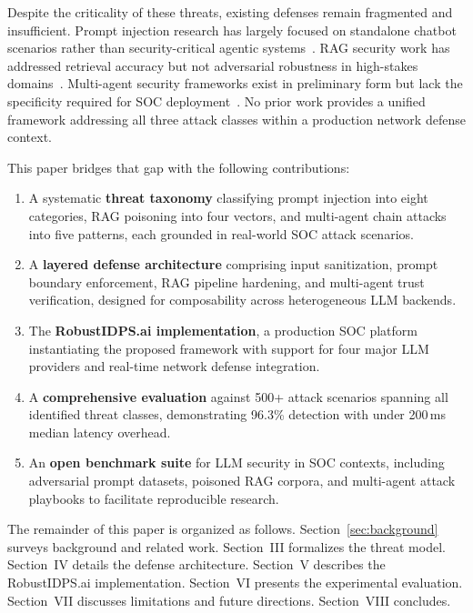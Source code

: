 \documentclass[journal,twoside]{IEEEtran}
\begin{document}
Despite the criticality of these threats, existing defenses remain fragmented and insufficient. Prompt injection research has largely focused on standalone chatbot scenarios rather than security-critical agentic systems~\cite{liu2024formalizing}. RAG security work has addressed retrieval accuracy but not adversarial robustness in high-stakes domains~\cite{gao2024rag}. Multi-agent security frameworks exist in preliminary form but lack the specificity required for SOC deployment~\cite{talebirad2023multiagent}. No prior work provides a unified framework addressing all three attack classes within a production network defense context.

This paper bridges that gap with the following contributions:

\begin{enumerate}
\item A systematic \textbf{threat taxonomy} classifying prompt injection into eight categories, RAG poisoning into four vectors, and multi-agent chain attacks into five patterns, each grounded in real-world SOC attack scenarios.

\item A \textbf{layered defense architecture} comprising input sanitization, prompt boundary enforcement, RAG pipeline hardening, and multi-agent trust verification, designed for composability across heterogeneous LLM backends.

\item The \textbf{RobustIDPS.ai implementation}, a production SOC platform instantiating the proposed framework with support for four major LLM providers and real-time network defense integration.

\item A \textbf{comprehensive evaluation} against 500+ attack scenarios spanning all identified threat classes, demonstrating 96.3\% detection with under 200\,ms median latency overhead.

\item An \textbf{open benchmark suite} for LLM security in SOC contexts, including adversarial prompt datasets, poisoned RAG corpora, and multi-agent attack playbooks to facilitate reproducible research.
\end{enumerate}

The remainder of this paper is organized as follows. Section~\ref{sec:background} surveys background and related work. Section~III formalizes the threat model. Section~IV details the defense architecture. Section~V describes the RobustIDPS.ai implementation. Section~VI presents the experimental evaluation. Section~VII discusses limitations and future directions. Section~VIII concludes.
\end{document}
